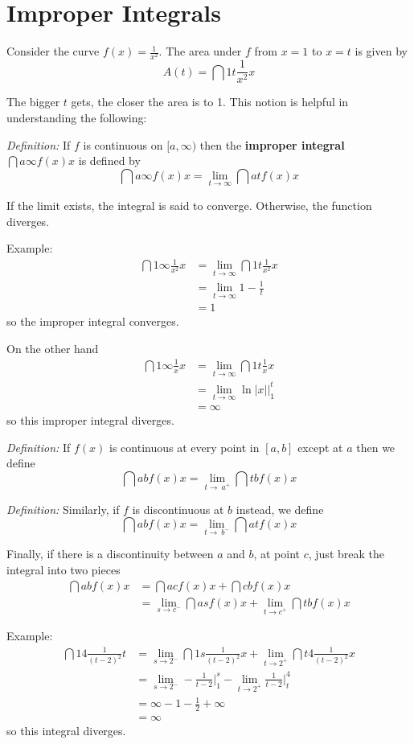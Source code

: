 \documentclass[12pt]{article}
\begin{document}
\section*{Improper Integrals}
Consider the curve $f(x) = \frac{1}{x^2}$. The area under $f$ from $x = 1$ to $x = t$ is given by \[ A(t) = \dint{1}{t}{\frac{1}{x^2}}{x} \]

The bigger $t$ gets, the closer the area is to 1. This notion is helpful in understanding the following:

\textit{Definition:} If $f$ is continuous on $[a,\infty)$ then the {\bf improper integral} $\dint{a}{\infty}{f(x)}{x}$ is defined by \[ \dint{a}{\infty}{f(x)}{x} = \lim_{t\to\infty} \dint{a}{t}{f(x)}{x} \]

If the limit exists, the integral is said to converge. Otherwise, the function diverges.

Example:
\begin{align*}
\dint{1}{\infty}{\frac{1}{x^2}}{x} &= \lim_{t\to\infty} \dint{1}{t}{\frac{1}{x^2}}{x}\\
&= \lim_{t\to\infty} 1-\frac{1}{t}\\
&= 1
\end{align*}
so the improper integral converges.

On the other hand
\begin{align*}
\dint{1}{\infty}{\frac{1}{x}}{x} &= \lim_{t\to\infty} \dint{1}{t}{\frac{1}{x}}{x}\\
&= \lim_{t\to\infty} \ln|x| \bigg|_1^t\\
&= \infty
\end{align*}
so this improper integral diverges.

\textit{Definition:} If $f(x)$ is continuous at every point in $[a,b]$ except at $a$ then we define \[ \dint{a}{b}{f(x)}{x} = \lim_{t\to\ a^+} \dint{t}{b}{f(x)}{x} \]

\textit{Definition:} Similarly, if $f$ is discontinuous at $b$ instead, we define \[ \dint{a}{b}{f(x)}{x} = \lim_{t\to\ b^-} \dint{a}{t}{f(x)}{x} \]

Finally, if there is a discontinuity between $a$ and $b$, at point $c$, just break the integral into two pieces
\begin{align*}
\dint{a}{b}{f(x)}{x} &= \dint{a}{c}{f(x)}{x} + \dint{c}{b}{f(x)}{x}\\
&= \lim_{s\to c^-} \dint{a}{s}{f(x)}{x} + \lim_{t\to c^+} \dint{t}{b}{f(x)}{x}
\end{align*}

Example:
\begin{align*}
\dint{1}{4}{\frac{1}{(t-2)^2}}{t} &= \lim_{s\to 2^-} \dint{1}{s}{\frac{1}{(t-2)^2}}{x} + \lim_{t\to 2^+} \dint{t}{4}{\frac{1}{(t-2)^2}}{x}\\
&= \lim_{s\to 2^-} -\frac{1}{t-2} \bigg|_1^s - \lim_{t\to 2^+} \frac{1}{t-2} \bigg|_t^4\\
&= \infty - 1 - \frac{1}{2} + \infty\\
&= \infty
\end{align*}
so this integral diverges.
\end{document}
